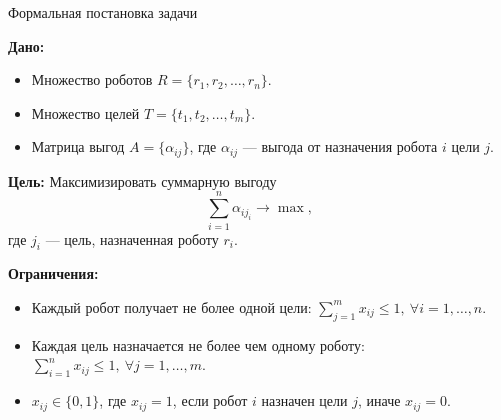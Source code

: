 \documentclass{beamer}
\begin{document}
	\begin{frame}{Формальная постановка задачи}
		
		\small
		\textbf{Дано:}
		\begin{itemize}
			\item Множество роботов $R = \{r_1, r_2, \ldots, r_n\}$.
			\item Множество целей $T = \{t_1, t_2, \ldots, t_m\}$.
			\item Матрица выгод $A = \{\alpha_{ij}\}$, где $\alpha_{ij}$ --- выгода от назначения робота $i$ цели $j$.
		\end{itemize}
		
		\textbf{Цель:} Максимизировать суммарную выгоду
		\[
		\sum_{i=1}^n \alpha_{i j_i} \rightarrow \max,
		\]
		где $j_i$ --- цель, назначенная роботу $r_i$.
		
		\textbf{Ограничения:}
		\begin{itemize}
			\item Каждый робот получает не более одной цели: $\sum_{j=1}^m x_{ij} \leq 1, \ \forall i = 1, \ldots, n$.
			\item Каждая цель назначается не более чем одному роботу: $\sum_{i=1}^n x_{ij} \leq 1, \ \forall j = 1, \ldots, m$.
			\item $x_{ij} \in \{0, 1\}$, где $x_{ij} = 1$, если робот $i$ назначен цели $j$, иначе $x_{ij} = 0$.
		\end{itemize}
	
	\end{frame}

	
\end{document}
